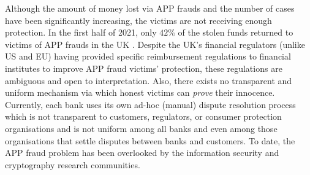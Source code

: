 %
%





Although the amount of money lost via  APP frauds and the number of cases have been significantly increasing, the victims are not receiving enough protection.  In the first half of 2021, only $42\%$ of the stolen funds returned to victims of  APP frauds in the UK \cite{2021-Half-Year-Fraud-Update}.  Despite the UK's financial regulators (unlike   US and EU) having provided specific reimbursement regulations to financial institutes to improve APP fraud victims' protection, these regulations are ambiguous and open to interpretation. Also,  there exists no transparent and uniform mechanism via which honest victims can  \emph{prove} their innocence. Currently, each bank uses its own ad-hoc (manual) dispute resolution process which is not transparent to customers, regulators, or consumer protection organisations and is not uniform among all banks and even among those organisations that settle disputes between banks and customers. To date, the APP fraud problem has been overlooked by the information security and cryptography research communities.


